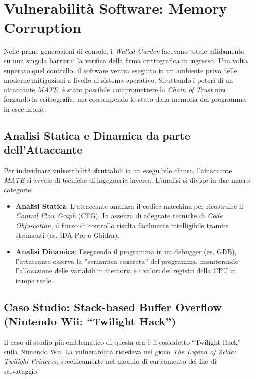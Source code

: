 \section{Vulnerabilità Software: Memory Corruption}

Nelle prime generazioni di console, i \textit{Walled Garden} facevano totale affidamento su una singola barriera: la verifica della firma crittografica in ingresso. Una volta superato quel controllo, il software veniva eseguito in un ambiente privo delle moderne mitigazioni a livello di sistema operativo. Sfruttando i poteri di un attaccante \textit{MATE}, è stato possibile compromettere la \textit{Chain of Trust} non forzando la crittografia, ma corrompendo lo stato della memoria del programma in esecuzione.

\subsection{Analisi Statica e Dinamica da parte dell'Attaccante}

Per individuare vulnerabilità sfruttabili in un eseguibile chiuso, l'attaccante \textit{MATE} si avvale di tecniche di ingegneria inversa. L'analisi si divide in due macro-categorie:

\begin{itemize}
    \item \textbf{Analisi Statica}: L'attaccante analizza il codice macchina per ricostruire il \textit{Control Flow Graph} (CFG). In assenza di adeguate tecniche di \textit{Code Obfuscation}, il flusso di controllo risulta facilmente intelligibile tramite strumenti (es. IDA Pro o Ghidra).
    \item \textbf{Analisi Dinamica}: Eseguendo il programma in un debugger (es. GDB), l'attaccante osserva la ''semantica concreta'' del programma, monitorando l'allocazione delle variabili in memoria e i valori dei registri della CPU in tempo reale.
\end{itemize}

\subsection{Caso Studio: Stack-based Buffer Overflow (Nintendo Wii: ``Twilight Hack'')}

Il caso di studio più emblematico di questa era è il cosiddetto ``Twilight Hack'' sulla Nintendo Wii. La vulnerabilità risiedeva nel gioco \textit{The Legend of Zelda: Twilight Princess}, specificamente nel modulo di caricamento del file di salvataggio.

